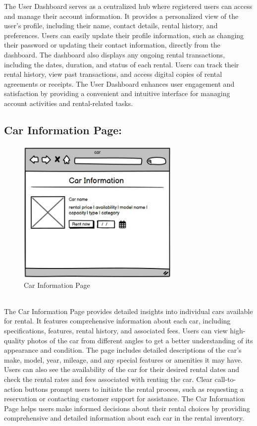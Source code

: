 The User Dashboard serves as a centralized hub where registered users can access and manage their account information. It provides a personalized view of the user's profile, including their name, contact details, rental history, and preferences. Users can easily update their profile information, such as changing their password or updating their contact information, directly from the dashboard. The dashboard also displays any ongoing rental transactions, including the dates, duration, and status of each rental. Users can track their rental history, view past transactions, and access digital copies of rental agreements or receipts. The User Dashboard enhances user engagement and satisfaction by providing a convenient and intuitive interface for managing account activities and rental-related tasks.\newpage
 \subsection{Car Information Page:  }


\begin{figure}[h]
\centering
\includegraphics[width=0.7\textwidth, inner]{sections/CarInformation.jpg}
\caption{Car Information Page}
\end{figure}\\
The Car Information Page provides detailed insights into individual cars available for rental. It features comprehensive information about each car, including specifications, features, rental history, and associated fees. Users can view high-quality photos of the car from different angles to get a better understanding of its appearance and condition. The page includes detailed descriptions of the car's make, model, year, mileage, and any special features or amenities it may have. Users can also see the availability of the car for their desired rental dates and check the rental rates and fees associated with renting the car. Clear call-to-action buttons prompt users to initiate the rental process, such as requesting a reservation or contacting customer support for assistance. The Car Information Page helps users make informed decisions about their rental choices by providing comprehensive and detailed information about each car in the rental inventory.\newpage

 
 
 
 
 